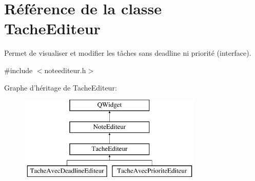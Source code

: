 \hypertarget{class_tache_editeur}{\section{Référence de la classe Tache\-Editeur}
\label{class_tache_editeur}
}


Permet de visualiser et modifier les tâches sans deadline ni priorité (interface).  




{\ttfamily \#include $<$noteediteur.\-h$>$}

Graphe d'héritage de Tache\-Editeur\-:\begin{figure}[H]
\begin{center}
\leavevmode
\includegraphics[height=4.000000cm]{class_tache_editeur}
\end{center}
\end{figure}
